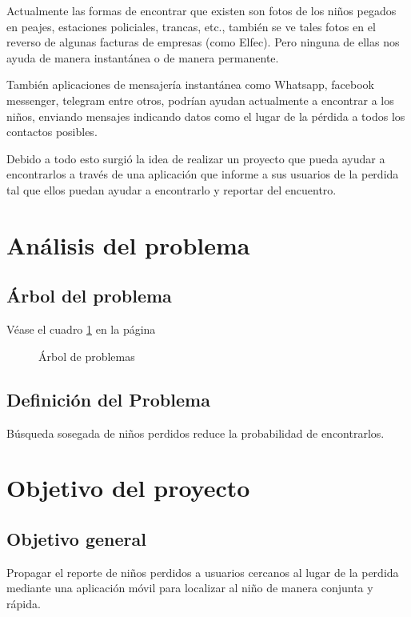 \documentclass[letter,11pt,oneside,spanish]{article}
\begin{document}
Actualmente las formas de encontrar que existen son fotos de los niños pegados en 
peajes, estaciones policiales, trancas, etc., también se ve tales fotos en el reverso de 
algunas facturas de empresas (como Elfec). Pero ninguna de ellas nos ayuda de manera
instantánea o de manera permanente.

También aplicaciones de mensajería instantánea como Whatsapp, facebook messenger, telegram  entre otros,
podrían ayudan actualmente a encontrar a los niños, enviando mensajes indicando datos
como el lugar de la pérdida a todos los contactos posibles.

Debido a todo esto surgió la idea de realizar un proyecto que pueda ayudar a 
encontrarlos a través de una aplicación que informe a sus usuarios de la 
perdida tal que ellos puedan ayudar a encontrarlo y reportar del encuentro.

\section{Análisis del problema}
\subsection{Árbol del problema}
Véase el cuadro \ref{arboldeproyecto} en la página \pageref{arboldeproyecto}

\begin{figure}
    \centering
    \def\svgwidth{\columnwidth}
    
    \caption{Árbol de problemas}
	\label{arboldeproyecto}
\end{figure}

\subsection{Definición del Problema}

Búsqueda  sosegada de niños perdidos reduce la probabilidad de encontrarlos.


\section{Objetivo del proyecto}
\subsection{Objetivo general}

Propagar el reporte de niños perdidos a usuarios cercanos al lugar de la perdida mediante una aplicación móvil 
para localizar al niño de manera conjunta y rápida.
\end{document}
